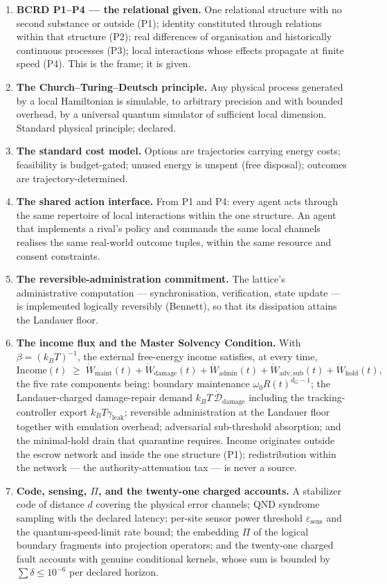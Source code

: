 \documentclass[
]{article}
\begin{document}
\begin{enumerate}
\def\labelenumi{\arabic{enumi}.}
\item
  \textbf{BCRD P1--P4 --- the relational given.} One relational
  structure with no second substance or outside (P1); identity
  constituted through relations within that structure (P2); real
  differences of organisation and historically continuous processes
  (P3); local interactions whose effects propagate at finite speed (P4).
  This is the frame; it is given.
\item
  \textbf{The Church--Turing--Deutsch principle.} Any physical process
  generated by a local Hamiltonian is simulable, to arbitrary precision
  and with bounded overhead, by a universal quantum simulator of
  sufficient local dimension. Standard physical principle; declared.
\item
  \textbf{The standard cost model.} Options are trajectories carrying
  energy costs; feasibility is budget-gated; unused energy is unspent
  (free disposal); outcomes are trajectory-determined.
\item
  \textbf{The shared action interface.} From P1 and P4: every agent acts
  through the same repertoire of local interactions within the one
  structure. An agent that implements a rival's policy and commands the
  same local channels realises the same real-world outcome tuples,
  within the same resource and consent constraints.
\item
  \textbf{The reversible-administration commitment.} The lattice's
  administrative computation --- synchronisation, verification, state
  update --- is implemented logically reversibly (Bennett), so that its
  dissipation attains the Landauer floor.
\item
  \textbf{The income flux and the Master Solvency Condition.} With
  \(\beta=(k_BT)^{-1}\), the external free-energy income satisfies, at
  every time, \[
  \mathrm{Income}(t)\;\ge\;\dot W_{\mathrm{maint}}(t)+\dot W_{\mathrm{damage}}(t)+\dot W_{\mathrm{admin}}(t)+\dot W_{\mathrm{adv,sub}}(t)+\dot W_{\mathrm{hold}}(t),
  \] the five rate components being: boundary maintenance
  \(\omega_0R(t)^{d_G-1}\); the Landauer-charged damage-repair demand
  \(k_BT\,\dot{\mathcal D}_{\mathrm{damage}}\) including the
  tracking-controller export \(k_BT\gamma_{\mathrm{leak}}\); reversible
  administration at the Landauer floor together with emulation overhead;
  adversarial sub-threshold absorption; and the minimal-hold drain that
  quarantine requires. Income originates outside the escrow network and
  inside the one structure (P1); redistribution within the network ---
  the authority-attenuation tax --- is never a source.
\item
  \textbf{Code, sensing, \(\Pi\), and the twenty-one charged accounts.}
  A stabilizer code of distance \(d\) covering the physical error
  channels; QND syndrome sampling with the declared latency; per-site
  sensor power threshold \(\varepsilon_{\mathrm{sens}}\) and the
  quantum-speed-limit rate bound; the embedding \(\Pi\) of the logical
  boundary fragments into projection operators; and the twenty-one
  charged fault accounts with genuine conditional kernels, whose sum is
  bounded by \(\sum\delta\le10^{-6}\) per declared horizon.
\end{enumerate}
\end{document}
